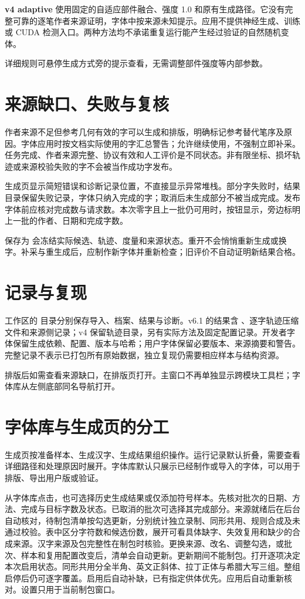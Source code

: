 \textbf{v4 adaptive} 使用固定的自适应部件融合、强度 1.0 和原有生成路径。它没有完整可靠的逐笔作者来源证明，字体中按来源未知提示。应用不提供神经生成、训练或 CUDA 检测入口。两种方法均不承诺重复运行能产生经过验证的自然随机变体。

详细规则可悬停生成方式旁的提示查看，无需调整部件强度等内部参数。

\section{来源缺口、失败与复核}
作者来源不足但参考几何有效的字可以生成和排版，明确标记参考替代笔序及原因。字体应用时按文档实际使用的字汇总警告；允许继续使用，不强制立即补采。任务完成、作者来源完整、协议有效和人工评价是不同状态。非有限坐标、损坏轨迹或来源校验失败的字不会被当作成功字发布。

生成页显示简短错误和诊断记录位置，不直接显示异常堆栈。部分字失败时，结果目录保留失败记录，字体只纳入完成的字；取消后未生成部分不被当成完成。发布字体前应核对完成数与请求数。本次零字且上一批仍可用时，按钮显示，旁边标明上一批的作者、日期和完成字数。

保存为  会冻结实际候选、轨迹、度量和来源状态。重开不会悄悄重新生成或换字。补采与重生成后，应制作新字体并重新检查；旧评价不自动证明新结果合格。

\section{记录与复现}
工作区的  目录分别保存导入、档案、结果与诊断。v6.1 的结果含 、逐字轨迹压缩文件和来源侧记录；v4 保留轨迹目录，另有实际方法及固定配置记录。开发者字体保留生成依赖、配置、版本与哈希；用户字体保留必要版本、来源摘要和警告。完整记录不表示已打包所有原始数据，独立复现仍需要相应样本与结构资源。

排版后如需查看来源缺口，在排版页打开。主窗口不再单独显示跨模块工具栏；字体库从左侧底部同名导航打开。

\section{字体库与生成页的分工}
生成页按准备样本、生成汉字、生成结果组织操作。运行记录默认折叠，需要查看详细路径和处理原因时展开。字体库默认只展示已经制作或导入的字体，可以用于排版、导出用户版或验证。

从字体库点击，也可选择历史生成结果或仅添加符号样本。先核对批次的日期、方法、完成与目标字数及状态。已取消的批次可选择其完成部分。来源就绪后在后台自动核对，待制包清单按勾选更新，分别统计独立录制、同形共用、规则合成及未通过校验。表中区分字符数和候选份数，展开可看具体缺字、失效复用和缺少的合成来源。汉字来源及包完整性在制包时核验。更换来源、改名、调整勾选，或批次、样本和复用配置改变后，清单会自动更新。更新期间不能制包。打开逐项决定本次启用状态。同形共用分全半角、英文正斜体、拉丁正体与希腊大写三组。整组启停后仍可逐字覆盖。启用后自动补缺，已有指定供体优先。应用后自动重新核对。设置只用于当前制包窗口。

